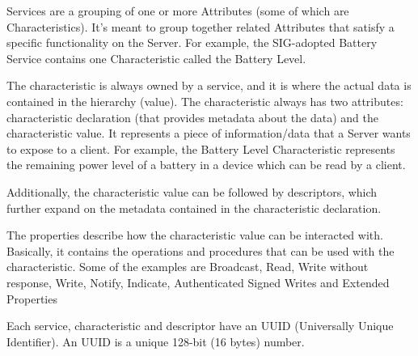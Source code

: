Services are a grouping of one or more Attributes (some of which are Characteristics). It’s meant to group together related Attributes that satisfy a specific functionality on the Server. For example, the SIG-adopted Battery Service contains one Characteristic called the Battery Level.

The characteristic is always owned by a service, and it is where the actual data is contained in the hierarchy (value). The characteristic always has two attributes: characteristic declaration (that provides metadata about the data) and the characteristic value. It represents a piece of information/data that a Server wants to expose to a client. For example, the Battery Level Characteristic represents the remaining power level of a battery in a device which can be read by a client.

Additionally, the characteristic value can be followed by descriptors, which further expand on the metadata contained in the characteristic declaration.

The properties describe how the characteristic value can be interacted with. Basically, it contains the operations and procedures that can be used with the characteristic. Some of the examples are Broadcast, Read, Write without response, Write, Notify, Indicate, Authenticated Signed Writes and Extended Properties

Each service, characteristic and descriptor have an UUID (Universally Unique Identifier). An UUID is a unique 128-bit (16 bytes) number.
